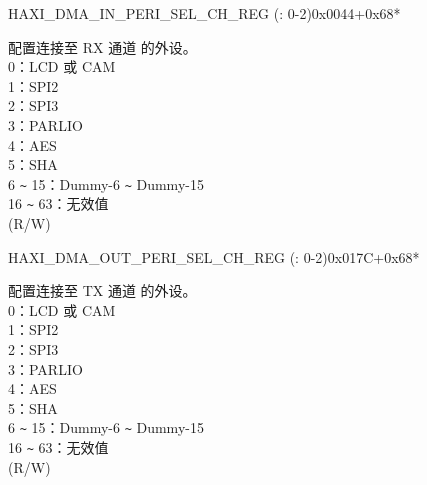 \begin{register}{H}{AXI\_DMA\_IN\_PERI\_SEL\_CH\_REG (: 0-2)}{0x0044+0x68*}\label{regdesc:AXIDMAINPERISELCHNREG}
%
%
\regnewline%
\begin{regdesc}\begin{reglist}
\label{fielddesc:AXIDMAPERIINSELCHN}\item [AXI\_DMA\_PERI\_IN\_SEL\_CH\regindex{n}] 配置连接至 RX 通道  的外设。\\ 0：LCD 或 CAM\\ 1：SPI2\\ 2：SPI3\\ 3：PARLIO\\ 4：AES\\ 5：SHA\\ 6 \verb+~+ 15：Dummy-6 \verb+~+ Dummy-15\\ 16 \verb+~+ 63：无效值\\ (R/W)
\end{reglist}\end{regdesc}
\end{register}


\begin{register}{H}{AXI\_DMA\_OUT\_PERI\_SEL\_CH\_REG (: 0-2)}{0x017C+0x68*}\label{regdesc:AXIDMAOUTPERISELCHNREG}
%
%
\regnewline%
\begin{regdesc}\begin{reglist}
\label{fielddesc:AXIDMAPERIOUTSELCHN}\item [AXI\_DMA\_PERI\_OUT\_SEL\_CH\regindex{n}] 配置连接至 TX 通道  的外设。\\ 0：LCD 或 CAM\\ 1：SPI2\\ 2：SPI3\\ 3：PARLIO\\ 4：AES\\ 5：SHA\\ 6 \verb+~+ 15：Dummy-6 \verb+~+ Dummy-15\\ 16 \verb+~+ 63：无效值\\ (R/W)
\end{reglist}\end{regdesc}
\end{register}


